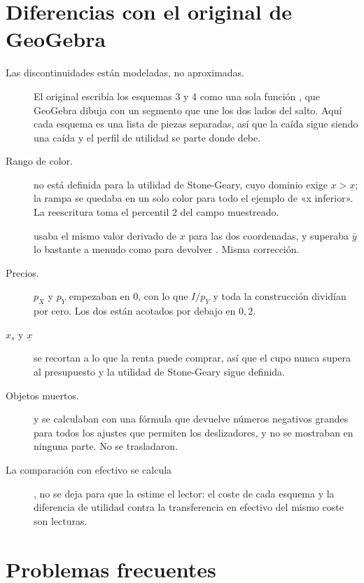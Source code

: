 \documentclass[11pt,a4paper]{appletmanual}
\begin{document}
\section{Diferencias con el original de GeoGebra}

\begin{description}
\item[Las discontinuidades están modeladas, no aproximadas.] El original
  escribía los esquemas 3 y 4 como una sola función , que GeoGebra
  dibuja con un segmento que une los dos lados del salto. Aquí cada esquema es
  una lista de piezas separadas, así que la caída sigue siendo una caída y el
  perfil de utilidad se parte donde debe.
\item[Rango de color.]  no está definida para la
  utilidad de Stone-Geary, cuyo dominio exige $x > \underline{x}$; la rampa se
  quedaba en un solo color para todo el ejemplo de «x inferior». La reescritura
  toma el percentil 2 del campo muestreado.
\item[] usaba el mismo valor derivado de $x$ para las dos
  coordenadas, y superaba $\bar y$ lo bastante a menudo como para devolver
  . Misma corrección.
\item[Precios.] $p_X$ y $p_Y$ empezaban en 0, con lo que $I/p_Y$ y toda la
  construcción dividían por cero. Los dos están acotados por debajo en $0{,}2$.
\item[$x_s$ y $\underline{x}$] se recortan a lo que la renta puede comprar, así
  que el cupo nunca supera al presupuesto y la utilidad de Stone-Geary sigue
  definida.
\item[Objetos muertos.]  y  se calculaban con una
  fórmula que devuelve números negativos grandes para todos los ajustes que
  permiten los deslizadores, y no se mostraban en ninguna parte. No se
  trasladaron.
\item[La comparación con efectivo se calcula], no se deja para que la estime el
  lector: el coste de cada esquema y la diferencia de utilidad contra la
  transferencia en efectivo del mismo coste son lecturas.
\end{description}

\section{Problemas frecuentes}
\end{document}
